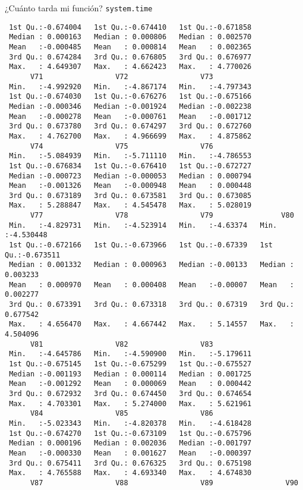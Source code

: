 \documentclass[xcolor={usenames,svgnames,dvipsnames}]{beamer}
\begin{document}
\begin{frame}[label={sec:org4570aee},fragile]{¿Cuánto tarda mi función? \texttt{system.time}}
\begin{verbatim}
 1st Qu.:-0.674004   1st Qu.:-0.674410   1st Qu.:-0.671858  
 Median : 0.000163   Median : 0.000806   Median : 0.002570  
 Mean   :-0.000485   Mean   : 0.000814   Mean   : 0.002365  
 3rd Qu.: 0.674284   3rd Qu.: 0.676805   3rd Qu.: 0.676977  
 Max.   : 4.649307   Max.   : 4.662423   Max.   : 4.770026  
      V71                 V72                 V73           
 Min.   :-4.992920   Min.   :-4.867174   Min.   :-4.797343  
 1st Qu.:-0.674030   1st Qu.:-0.676276   1st Qu.:-0.675166  
 Median :-0.000346   Median :-0.001924   Median :-0.002238  
 Mean   :-0.000278   Mean   :-0.000761   Mean   :-0.001712  
 3rd Qu.: 0.673780   3rd Qu.: 0.674297   3rd Qu.: 0.672760  
 Max.   : 4.762700   Max.   : 4.966699   Max.   : 4.875862  
      V74                 V75                 V76           
 Min.   :-5.084939   Min.   :-5.711110   Min.   :-4.786553  
 1st Qu.:-0.676834   1st Qu.:-0.676410   1st Qu.:-0.672727  
 Median :-0.000723   Median :-0.000053   Median : 0.000794  
 Mean   :-0.001326   Mean   :-0.000948   Mean   : 0.000448  
 3rd Qu.: 0.673189   3rd Qu.: 0.673581   3rd Qu.: 0.673085  
 Max.   : 5.288847   Max.   : 4.545478   Max.   : 5.028019  
      V77                 V78                 V79                V80           
 Min.   :-4.829731   Min.   :-4.523914   Min.   :-4.63374   Min.   :-4.530448  
 1st Qu.:-0.672166   1st Qu.:-0.673966   1st Qu.:-0.67339   1st Qu.:-0.673511  
 Median : 0.001332   Median : 0.000963   Median :-0.00133   Median : 0.003233  
 Mean   : 0.000970   Mean   : 0.000408   Mean   :-0.00007   Mean   : 0.002277  
 3rd Qu.: 0.673391   3rd Qu.: 0.673318   3rd Qu.: 0.67319   3rd Qu.: 0.677542  
 Max.   : 4.656470   Max.   : 4.667442   Max.   : 5.14557   Max.   : 4.504096  
      V81                 V82                 V83           
 Min.   :-4.645786   Min.   :-4.590900   Min.   :-5.179611  
 1st Qu.:-0.675145   1st Qu.:-0.675299   1st Qu.:-0.675527  
 Median :-0.001193   Median : 0.000114   Median : 0.001725  
 Mean   :-0.001292   Mean   : 0.000069   Mean   : 0.000442  
 3rd Qu.: 0.672932   3rd Qu.: 0.674450   3rd Qu.: 0.674654  
 Max.   : 4.703301   Max.   : 5.274000   Max.   : 5.621961  
      V84                 V85                 V86           
 Min.   :-5.023343   Min.   :-4.820378   Min.   :-4.618428  
 1st Qu.:-0.674270   1st Qu.:-0.673109   1st Qu.:-0.675796  
 Median : 0.000196   Median : 0.002036   Median :-0.001797  
 Mean   :-0.000330   Mean   : 0.001627   Mean   :-0.000397  
 3rd Qu.: 0.675411   3rd Qu.: 0.676325   3rd Qu.: 0.675198  
 Max.   : 4.765588   Max.   : 4.693340   Max.   : 4.674830  
      V87                 V88                 V89                 V90          

\end{verbatim}
\end{frame}
\end{document}
